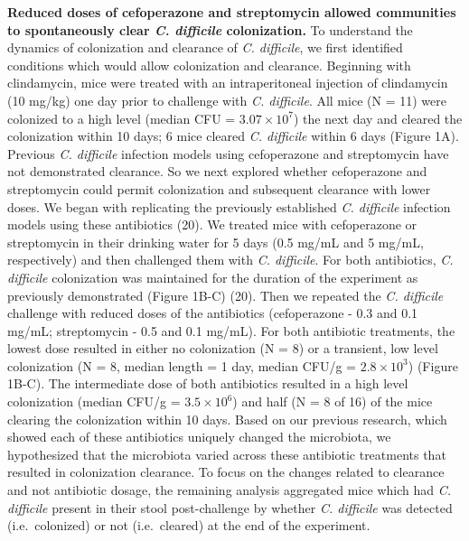 \documentclass[12pt,]{article}
\begin{document}
\textbf{Reduced doses of cefoperazone and streptomycin allowed
communities to spontaneously clear \emph{C. difficile} colonization.} To
understand the dynamics of colonization and clearance of \emph{C.
difficile}, we first identified conditions which would allow
colonization and clearance. Beginning with clindamycin, mice were
treated with an intraperitoneal injection of clindamycin (10 mg/kg) one
day prior to challenge with \emph{C. difficile}. All mice (N = 11) were
colonized to a high level (median CFU = \(3.07 \times 10^7\)) the next
day and cleared the colonization within 10 days; 6 mice cleared \emph{C.
difficile} within 6 days (Figure 1A). Previous \emph{C. difficile}
infection models using cefoperazone and streptomycin have not
demonstrated clearance. So we next explored whether cefoperazone and
streptomycin could permit colonization and subsequent clearance with
lower doses. We began with replicating the previously established
\emph{C. difficile} infection models using these antibiotics (20). We
treated mice with cefoperazone or streptomycin in their drinking water
for 5 days (0.5 mg/mL and 5 mg/mL, respectively) and then challenged
them with \emph{C. difficile}. For both antibiotics, \emph{C. difficile}
colonization was maintained for the duration of the experiment as
previously demonstrated (Figure 1B-C) (20). Then we repeated the
\emph{C. difficile} challenge with reduced doses of the antibiotics
(cefoperazone - 0.3 and 0.1 mg/mL; streptomycin - 0.5 and 0.1 mg/mL).
For both antibiotic treatments, the lowest dose resulted in either no
colonization (N = 8) or a transient, low level colonization (N = 8,
median length = 1 day, median CFU/g = \(2.8 \times 10^3\)) (Figure
1B-C). The intermediate dose of both antibiotics resulted in a high
level colonization (median CFU/g = \(3.5 \times 10^6\)) and half (N = 8
of 16) of the mice clearing the colonization within 10 days. Based on
our previous research, which showed each of these antibiotics uniquely
changed the microbiota, we hypothesized that the microbiota varied
across these antibiotic treatments that resulted in colonization
clearance. To focus on the changes related to clearance and not
antibiotic dosage, the remaining analysis aggregated mice which had
\emph{C. difficile} present in their stool post-challenge by whether
\emph{C. difficile} was detected (i.e.~colonized) or not (i.e.~cleared)
at the end of the experiment.
\end{document}
